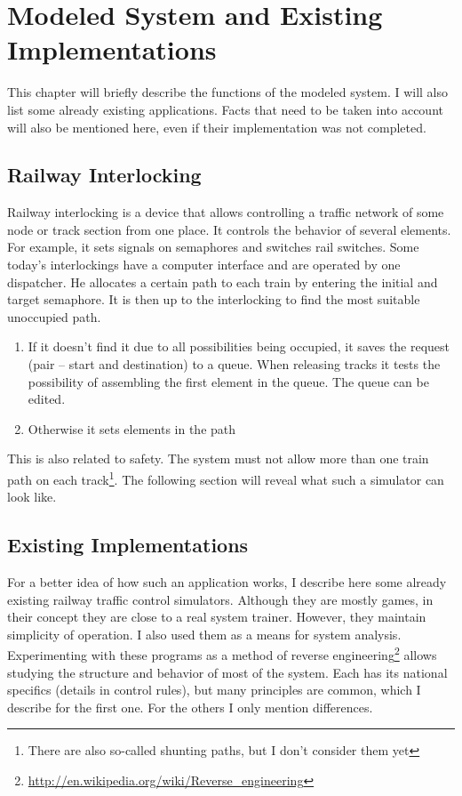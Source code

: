 \documentclass[english]{cls/fitthesis}
\begin{document}
\chapter{Modeled System and Existing Implementations}
This chapter will briefly describe the functions of the modeled system. I will also list some already existing applications.
Facts that need to be taken into account will also be mentioned here, even if their implementation was not completed.
  \section{Railway Interlocking}
  Railway interlocking is a device that allows controlling a traffic network of some node
  or track section from one place. It controls the behavior of several elements.
  For example, it sets signals on semaphores and switches rail switches.
  Some today's interlockings have a computer interface and are operated by one dispatcher. He allocates
  a certain path to each train by entering the initial and target semaphore. It is then up to the interlocking to find the most suitable
  unoccupied path.
  \begin{enumerate}
    \item If it doesn't find it due to all possibilities being occupied, it saves the request (pair -- start and destination) to a queue.
          When releasing tracks it tests the possibility of assembling the first element in the queue. The queue can be edited.
    \item Otherwise it sets elements in the path
  \end{enumerate}
  This is also related to safety. The system must not allow more than one
  train path on each track\footnote{There are also so-called shunting paths, but I don't consider them yet}.
  The following section will reveal what such a simulator can look like.

  \section{Existing Implementations}\label{recenzes}
  For a better idea of how such an application works, I describe here
  some already existing railway traffic control simulators. Although they are mostly games, in their concept
  they are close to a real system trainer. However, they maintain simplicity of operation.
  I also used them as a means for system analysis. Experimenting with these programs as a method
  of reverse engineering\footnote{\url{http://en.wikipedia.org/wiki/Reverse_engineering}} allows studying the structure
  and behavior of most of the system. Each has its national specifics (details in control rules), but many principles are common, which I describe for the first one. For the others I only mention differences.
\end{document}
